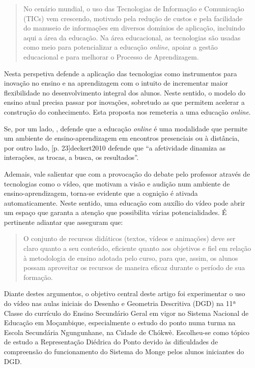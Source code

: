 \documentclass[portuguese]{textolivre}
\begin{document}
\begin{quote}
    No cenário mundial, o uso das Tecnologias de Informação e Comunicação (TICs) vem crescendo, motivado pela redução de custos e pela facilidade do manuseio de informações em diversos domínios de aplicação, incluindo aqui a área da educação. Na área educacional, as tecnologias são usadas como meio para potencializar a educação \textit{online}, apoiar a gestão educacional e para melhorar o Processo de Aprendizagem.
\end{quote}

Nesta perspetiva \textcite{deckert2010} defende a aplicação das tecnologias como instrumentos para inovação no ensino e na aprendizagem com o intuito de incrementar maior flexibilidade no desenvolvimento integral dos alunos. Neste sentido, o modelo do ensino atual precisa passar por inovações, sobretudo as que permitem acelerar a construção do conhecimento. Esta proposta nos remeteria a uma educação \textit{online}.

Se, por um lado, , defende que a educação \textit{online} é uma modalidade que permite um ambiente de ensino-aprendizagem em encontros presenciais ou à distância, por outro lado, [p. 23]{deckert2010} defende que ``a afetividade dinamiza as interações, as trocas, a busca, os resultados''. 

Ademais, vale salientar que com a provocação do debate pelo professor através de tecnologias como o vídeo, que motivam a visão e audição num ambiente de ensino-aprendizagem, torna-se evidente que a cognição é ativada automaticamente. Neste sentido, uma educação com auxílio do vídeo pode abrir um espaço que garanta a atenção que possibilita várias potencialidades. É pertinente adiantar que \textcite[p. 2]{oliveira2014} asseguram que:

\begin{quote}
    O conjunto de recursos didáticos (textos, vídeos e animações) deve ser claro quanto a seu conteúdo, eficiente quanto aos objetivos e fiel em relação à metodologia de ensino adotada pelo curso, para que, assim, os alunos possam aproveitar os recursos de maneira eficaz durante o período de sua formação.
\end{quote}

Diante destes argumentos, o objetivo central deste artigo foi experimentar o uso do vídeo nas aulas iniciais do Desenho e Geometria Descritiva (DGD) na 11ª Classe do currículo do Ensino Secundário Geral em vigor no Sistema Nacional de Educação em Moçambique, especialmente o estudo do ponto numa turma na Escola Secundária Ngungunhane, na Cidade de Chókwè. Escolheu-se como tópico de estudo a Representação Diédrica do Ponto devido às dificuldades de compreensão do funcionamento do Sistema do Monge pelos alunos iniciantes do DGD.
\end{document}
